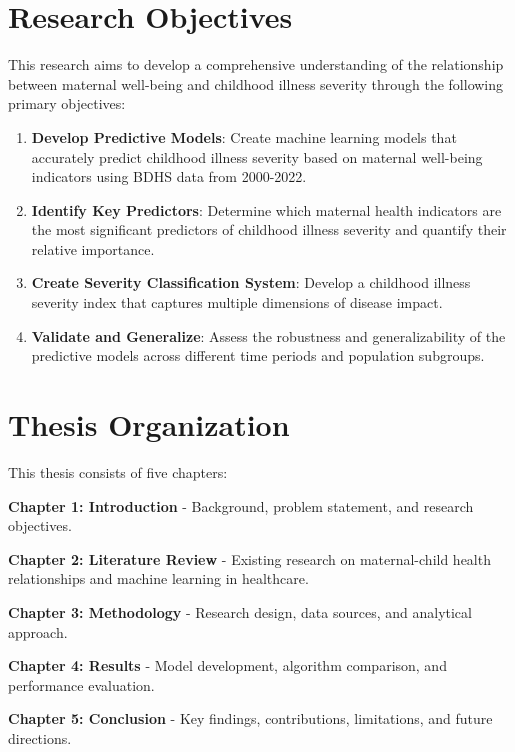 \documentclass[12pt]{report}
\begin{document}
\section{Research Objectives}

This research aims to develop a comprehensive understanding of the relationship between maternal well-being and childhood illness severity through the following primary objectives:

\begin{enumerate}
    \item \textbf{Develop Predictive Models}: Create machine learning models that accurately predict childhood illness severity based on maternal well-being indicators using BDHS data from 2000-2022.
    
    \item \textbf{Identify Key Predictors}: Determine which maternal health indicators are the most significant predictors of childhood illness severity and quantify their relative importance.
    
    \item \textbf{Create Severity Classification System}: Develop a childhood illness severity index that captures multiple dimensions of disease impact.
    
    \item \textbf{Validate and Generalize}: Assess the robustness and generalizability of the predictive models across different time periods and population subgroups.
\end{enumerate}

\section{Thesis Organization}

This thesis consists of five chapters:

\textbf{Chapter 1: Introduction} - Background, problem statement, and research objectives.

\textbf{Chapter 2: Literature Review} - Existing research on maternal-child health relationships and machine learning in healthcare.

\textbf{Chapter 3: Methodology} - Research design, data sources, and analytical approach.

\textbf{Chapter 4: Results} - Model development, algorithm comparison, and performance evaluation.

\textbf{Chapter 5: Conclusion} - Key findings, contributions, limitations, and future directions.
\end{document}
